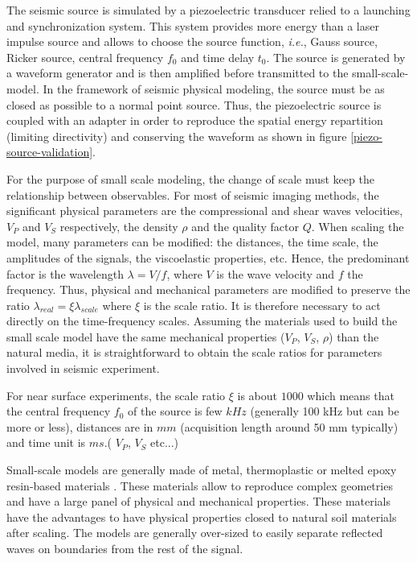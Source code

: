 \documentclass[manuscript,revised]{geophysics}
\begin{document}
\noindent The seismic source is simulated by a piezoelectric transducer relied to a launching and synchronization system. This system provides more energy than a laser impulse source \citep{Bretaudeau_PHD_2010,Bretaudeau_SSM_2011} and allows to choose the source function, \textit{i.e.}, Gauss source, Ricker source, central frequency $f_{0}$ and time delay $t_{0}$. The source is generated by a waveform generator and is then amplified before transmitted to the small-scale-model. In the framework of seismic physical modeling, the source must be as closed as possible to a normal point source. Thus, the piezoelectric source is coupled with an adapter in order to reproduce the spatial energy repartition (limiting directivity) and conserving the waveform as shown in figure \ref{piezo-source-validation}.

\noindent For the purpose of small scale modeling, the change of scale must keep the relationship between observables. For most of seismic imaging methods, the significant physical parameters are the compressional and shear waves velocities, $V_{P}$ and $V_{S}$ respectively, the density $\rho$ and the quality factor $Q$. When scaling the model, many parameters can be modified: the distances, the time scale, the amplitudes of the signals, the viscoelastic properties, etc. Hence, the predominant factor is the wavelength $\lambda = V / f$, where $V$ is the wave velocity and $f$ the frequency. Thus, physical and mechanical parameters are modified to preserve the ratio $\lambda_{real} = \xi \lambda_{scale}$ where $\xi$ is the scale ratio. It is therefore necessary to act directly on the time-frequency scales. Assuming the materials used to build the small scale model have the same mechanical properties ($V_{P}$, $V_{S}$, $\rho$) than the natural media, it is straightforward to obtain the scale ratios for parameters involved in seismic experiment.

\noindent For near surface experiments, the scale ratio $\xi$ is about $1000$ which means that the central frequency $f_{0}$ of the source is few $kHz$ (generally 100 kHz but can be more or less), distances are in $mm$ (acquisition length around 50 mm typically) and time unit is $ms$.( $V_{P}$, $V_{S}$ etc...)

\noindent Small-scale models are generally made of metal, thermoplastic or melted epoxy resin-based materials \citep{Bretaudeau_FWI_2013,Bretaudeau_SSM_2011,Bretaudeau_SSA_2008b}. These materials allow to reproduce complex geometries and have a large panel of physical and mechanical properties. These materials have the advantages to have physical properties closed to natural soil materials after scaling. The models are generally over-sized to easily separate reflected waves on boundaries from the rest of the signal. 
\end{document}
